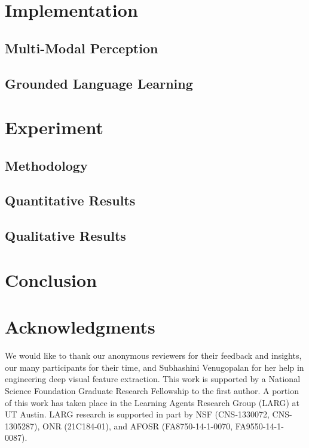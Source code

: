 \documentclass{article}
\begin{document}
\section{Implementation}
\label{sec:implementation}
	

	\subsection{Multi-Modal Perception}
	\label{ssec:mmp}
	

	\subsection{Grounded Language Learning}
	\label{ssec:gll}
	

\section{Experiment}
\label{sec:experiment}
	

	\subsection{Methodology}
	\label{ssec:methodology}
	

	\subsection{Quantitative Results}
	\label{ssec:results}
	

	\subsection{Qualitative Results}
	\label{ssec:qualitative}
	

\section{Conclusion}
\label{sec:conclusion}


\section*{Acknowledgments}

We would like to thank our anonymous reviewers for their feedback and insights, our many participants for their time, and Subhashini Venugopalan for her help in engineering deep visual feature extraction. This work is supported by a National Science Foundation Graduate Research Fellowship to the first author. A portion of this work has taken place in the Learning Agents Research Group (LARG) at UT Austin. LARG research is supported in part by NSF (CNS-1330072, CNS-1305287), ONR (21C184-01), and AFOSR (FA8750-14-1-0070, FA9550-14-1-0087).



\end{document}
